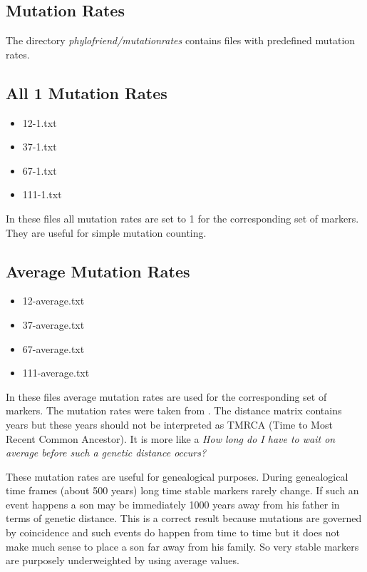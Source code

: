 \subsection{Mutation Rates}

The directory \emph{phylofriend/mutationrates} contains
files with predefined mutation rates.

\subsection*{All 1 Mutation Rates}

\begin{itemize}
\item 12-1.txt
\item 37-1.txt
\item 67-1.txt
\item 111-1.txt
\end{itemize}

In these files all mutation rates are set to 1 for the
corresponding set of markers. They are useful for simple
mutation counting.


\subsection*{Average Mutation Rates}

\begin{itemize}
\item 12-average.txt
\item 37-average.txt
\item 67-average.txt
\item 111-average.txt
\end{itemize}

In these files average mutation rates are used for the
corresponding set of markers. The mutation rates were taken
from \cite{Kly12}. The distance matrix contains years but
these years should not be interpreted as TMRCA (Time to Most
Recent Common Ancestor). It is more like a \emph{How long
do I have to wait on average before such a genetic distance
occurs?}

These mutation rates are useful for genealogical purposes.
During genealogical time frames (about 500 years) long time
stable markers rarely change. If such an event happens a
son may be immediately 1000 years away from his father in
terms of genetic distance. This is a correct result because
mutations are governed by coincidence and such events do
happen from time to time but it does not make much sense
to place a son far away from his family. So very stable
markers are purposely underweighted by using average
values.



